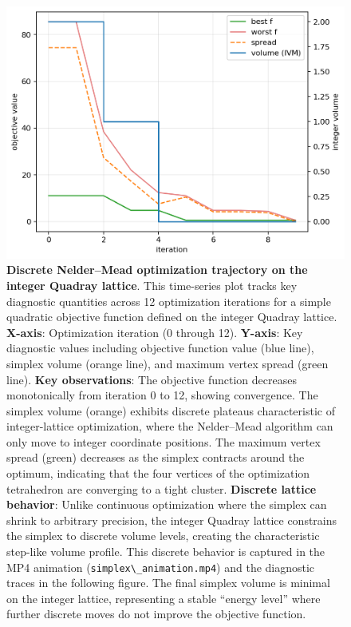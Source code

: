 \documentclass[
  10pt,
]{article}
\newcommand{\passthrough}[1]{#1}
\begin{document}
\begin{figure}
\centering
\includegraphics{../output/figures/simplex_trace.png}
\caption{\textbf{Discrete Nelder--Mead optimization trajectory on the
integer Quadray lattice}. This time-series plot tracks key diagnostic
quantities across 12 optimization iterations for a simple quadratic
objective function defined on the integer Quadray lattice.
\textbf{X-axis}: Optimization iteration (0 through 12). \textbf{Y-axis}:
Key diagnostic values including objective function value (blue line),
simplex volume (orange line), and maximum vertex spread (green line).
\textbf{Key observations}: The objective function decreases
monotonically from iteration 0 to 12, showing convergence. The simplex
volume (orange) exhibits discrete plateaus characteristic of
integer-lattice optimization, where the Nelder--Mead algorithm can only
move to integer coordinate positions. The maximum vertex spread (green)
decreases as the simplex contracts around the optimum, indicating that
the four vertices of the optimization tetrahedron are converging to a
tight cluster. \textbf{Discrete lattice behavior}: Unlike continuous
optimization where the simplex can shrink to arbitrary precision, the
integer Quadray lattice constrains the simplex to discrete volume
levels, creating the characteristic step-like volume profile. This
discrete behavior is captured in the MP4 animation
(\passthrough{\lstinline!simplex\_animation.mp4!}) and the diagnostic
traces in the following figure. The final simplex volume is minimal on
the integer lattice, representing a stable ``energy level'' where
further discrete moves do not improve the objective function.}
\end{figure}
\end{document}
